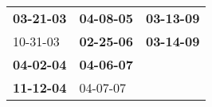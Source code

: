 \begin{supertabular}{p{0.33\columnwidth}p{0.33\columnwidth}p{0.33\columnwidth}}
 \textbf{03-21-03\textsuperscript{}} &  \textbf{04-08-05\textsuperscript{}} &  \textbf{03-13-09\textsuperscript{}} \\
          10-31-03\textsuperscript{} &  \textbf{02-25-06\textsuperscript{}} &  \textbf{03-14-09\textsuperscript{}} \\
 \textbf{04-02-04\textsuperscript{}} &  \textbf{04-06-07\textsuperscript{}} &                                      \\
 \textbf{11-12-04\textsuperscript{}} &           04-07-07\textsuperscript{} &                                      \\
\end{supertabular}
